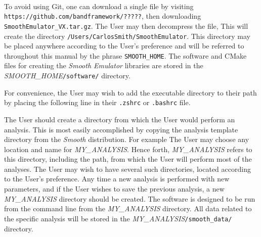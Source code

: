 \documentclass[UserManual.tex]{subfiles}
\begin{document}
\begin{sloppypar}
\\
To avoid using Git, one can download a single file by visiting {\tt https://github.com/bandframework/?????}, then downloading {\tt SmoothEmulator\_VX.tar.gz}. The User may then decompress the file,
\vspace*{-8pt}{\tt \begin{Verbatim}[commandchars=\\\{\}]
/Users/CarlosSmith% \textcolor{darkred}{gunzip SmoothEmulator_V1.x.tar.gz}
/Users/CarlosSmith% \textcolor{darkred}{tar -xf SmoothEmulator_V1.x.tar}
\end{Verbatim}
}\vspace*{-8pt}
This will create the directory {\tt /Users/CarlosSmith/SmoothEmulator}. This directory may be placed anywhere according to the User's preference and will be referred to throughout this manual by the phrase {\tt SMOOTH\_HOME}. The software and CMake files for creating the {\it Smooth Emulator} libraries are stored in the \textit{SMOOTH\_HOME}{\tt /software/} directory.

For convenience, the User may wish to add the executable directory to their path by placing the following line in their {\tt .zshrc} or {\tt .bashrc} file.
\vspace*{-8pt}{\tt \begin{Verbatim}[commandchars=\\\{\}]
% \textcolor{darkred}{export PATH=${PATH}:\textit{SMOOTH_HOME}/bin}
\end{Verbatim}
}\vspace*{-8pt}

The User should create a directory from which the User would perform an analysis. This is most easily accomplished by copying the analysis template directory from the {\it Smooth} distribution. For example
\vspace*{-8pt}{\tt \begin{Verbatim}[commandchars=\\\{\}]
% \textcolor{darkred}{cp -r \textit{SMOOTH_HOME}/AnalysisTemplate \textit{MY_ANALYSIS}}
\end{Verbatim}
}\vspace*{-8pt}
The User may choose any location and name for \textit{MY\_ANALYSIS}. Hence forth, \textit{MY\_ANALYSIS} refers to this directory, including the path, from which the User will perform most of the analyses. The User may wish to have several such directories, located according to the User's preference. Any time a new analysis is performed with new parameters, and if the User wishes to save the previous analysis, a new \textit{MY\_ANALYSIS} directory should be created. The software is designed to be run from the command line from the  \textit{MY\_ANALYSIS} directory. All data related to the specific analysis will be stored in the \textit{MY\_ANALYSIS}{\tt/smooth\_data/} directory.


\end{sloppypar}
\end{document}
